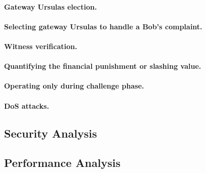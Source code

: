 \paragraph{Gateway Ursulas election.} 


\paragraph{Selecting gateway Ursulas to handle a Bob's complaint.}


\paragraph{Witness verification.}


\paragraph{Quantifying the financial punishment or slashing value.}


\paragraph{Operating only during challenge phase.}


\paragraph{DoS attacks.}


\subsection{Security Analysis}


\subsection{Performance Analysis}
